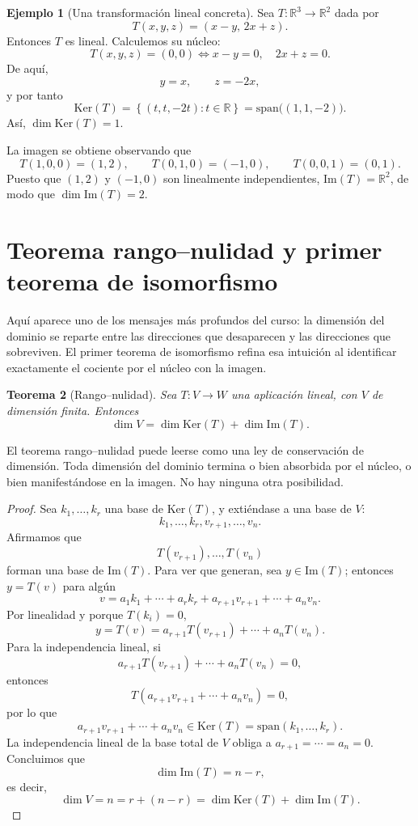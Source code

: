 \documentclass[10pt,a4paper,oneside]{article}
\theoremstyle{plain}
\newtheorem{theorem}{Teorema}[section]
\theoremstyle{definition}
\newtheorem{example}[theorem]{Ejemplo}
\theoremstyle{remark}
\newcommand{\R}{\mathbb{R}}
\newcommand{\Ker}{\mathrm{Ker}}
\newcommand{\Ima}{\mathrm{Im}}
\newcommand{\Span}{\mathrm{span}}
\newcommand{\set}[1]{\left\{ #1 \right\}}
\begin{document}
\begin{example}[Una transformación lineal concreta]
Sea \(T:\R^3\to\R^2\) dada por
\[
T(x,y,z)=(x-y,\,2x+z).
\]
Entonces \(T\) es lineal. Calculemos su núcleo:
\[
T(x,y,z)=(0,0)
\iff
x-y=0,\quad 2x+z=0.
\]
De aquí,
\[
y=x,\qquad z=-2x,
\]
y por tanto
\[
\Ker(T)=\set{(t,t,-2t): t\in\R}=\Span\bigl((1,1,-2)\bigr).
\]
Así, \(\dim\Ker(T)=1\).

La imagen se obtiene observando que
\[
T(1,0,0)=(1,2),\qquad T(0,1,0)=(-1,0),\qquad T(0,0,1)=(0,1).
\]
Puesto que \((1,2)\) y \((-1,0)\) son linealmente independientes, \(\Ima(T)=\R^2\), de modo que \(\dim\Ima(T)=2\).
\end{example}

\section{Teorema rango--nulidad y primer teorema de isomorfismo}
\begin{ideaBox}
Aquí aparece uno de los mensajes más profundos del curso: la dimensión del dominio se reparte entre las direcciones que desaparecen y las direcciones que sobreviven. El primer teorema de isomorfismo refina esa intuición al identificar exactamente el cociente por el núcleo con la imagen.
\end{ideaBox}
\begin{theorem}[Rango--nulidad]
Sea \(T:V\to W\) una aplicación lineal, con \(V\) de dimensión finita. Entonces
\[
\dim V=\dim\Ker(T)+\dim\Ima(T).
\]
\end{theorem}

\begin{intuitionBox}
El teorema rango--nulidad puede leerse como una ley de conservación de dimensión. Toda dimensión del dominio termina o bien absorbida por el núcleo, o bien manifestándose en la imagen. No hay ninguna otra posibilidad.
\end{intuitionBox}

\begin{proof}
Sea \(k_1,\dots,k_r\) una base de \(\Ker(T)\), y extiéndase a una base de \(V\):
\[
k_1,\dots,k_r,v_{r+1},\dots,v_n.
\]
Afirmamos que
\[
T(v_{r+1}),\dots,T(v_n)
\]
forman una base de \(\Ima(T)\). Para ver que generan, sea \(y\in\Ima(T)\); entonces \(y=T(v)\) para algún
\[
v=a_1k_1+\cdots+a_rk_r+a_{r+1}v_{r+1}+\cdots+a_n v_n.
\]
Por linealidad y porque \(T(k_i)=0\),
\[
y=T(v)=a_{r+1}T(v_{r+1})+\cdots+a_n T(v_n).
\]
Para la independencia lineal, si
\[
a_{r+1}T(v_{r+1})+\cdots+a_n T(v_n)=0,
\]
entonces
\[
T(a_{r+1}v_{r+1}+\cdots+a_n v_n)=0,
\]
por lo que
\[
a_{r+1}v_{r+1}+\cdots+a_n v_n\in\Ker(T)=\Span(k_1,\dots,k_r).
\]
La independencia lineal de la base total de \(V\) obliga a \(a_{r+1}=\cdots=a_n=0\). Concluimos que
\[
\dim\Ima(T)=n-r,
\]
es decir,
\[
\dim V=n=r+(n-r)=\dim\Ker(T)+\dim\Ima(T).
\]
\end{proof}
\end{document}
